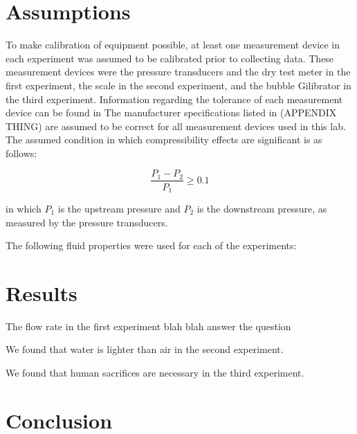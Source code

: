 \documentclass[paper=letter, fontsize=10pt]{scrartcl} %
\begin{document}
\section{Assumptions}
To make calibration of equipment possible, at least one measurement device in each experiment was assumed to be calibrated prior to collecting data.  These measurement devices were the pressure transducers and the dry test meter in the first experiment, the scale in the second experiment, and the bubble Gilibrator in the third experiment.
Information regarding the tolerance of each measurement device can be found in %
The manufacturer specifications listed in (APPENDIX THING) are assumed to be correct for all measurement devices used in this lab.
\newline
\newline
The assumed condition in which compressibility effects are significant is as follows:

\begin{equation}
\frac{P_1 - P_2}{P_1} \geq 0.1
\end{equation}

in which \(P_1\) is the upstream pressure and \(P_2\) is the downstream pressure, as measured by the pressure transducers.

The following fluid properties were used for each of the experiments:


\section{Results}
The flow rate in the first experiment blah blah answer the question

We found that water is lighter than air in the second experiment.

We found that human sacrifices are necessary in the third experiment.

\section{Conclusion}
\end{document}
